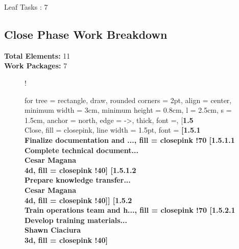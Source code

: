     Leaf Tasks : 7

\subsection {
  Close Phase Work Breakdown
}

\noindent\textbf { Total Elements: }
11
\\\textbf { Work Packages: }
7

\vspace {
  0.5em
}

\begin{figure}[H]
\centering
\resizebox{\textwidth} { ! }
{
\begin { forest }
  for
    tree =
        {
            rectangle,
            draw,
            rounded corners = 2pt,
            align = center,
            minimum width = 3cm,
            minimum height = 0.8cm,
            l = 2.5cm,
            s = 1.5cm,
            anchor = north,
            edge = {->, thick},
            font =\tiny,
        }[{\textbf{1.5}\\Close}, fill = closepink, line width = 1.5pt,
          font =\bfseries
              [{\textbf{1.5.1}\\Finalize documentation and ...},
               fill = closepink !70 [{\textbf{1.5.1.1}\\Complete technical
                                             document...\\\scriptsize Cesar
                                                 Magana\\\scriptsize 4d},
                                     fill = closepink !40]
                                    [{\textbf{1.5.1.2}\\Prepare knowledge
                                             transfer...\\\scriptsize Cesar
                                                 Magana\\\scriptsize 4d},
                                     fill = closepink !40]]
              [{\textbf{1.5.2}\\Train operations team and h...},
               fill = closepink !70 [{\textbf{1.5.2.1}\\Develop training
                                             materials...\\\scriptsize Shawn
                                                 Ciaciura\\\scriptsize 3d},
                                     fill = closepink !40]

\end{ forest }}
\end{figure}
